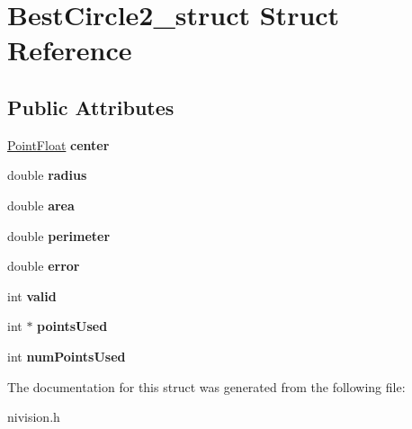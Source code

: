 \hypertarget{structBestCircle2__struct}{\section{\-Best\-Circle2\-\_\-struct \-Struct \-Reference}
\label{structBestCircle2__struct}
}
\subsection*{\-Public \-Attributes}
\begin{DoxyCompactItemize}
\item 
\hypertarget{structBestCircle2__struct_a96290746002b0162064649423d17b668}{\hyperlink{structPointFloat__struct}{\-Point\-Float} {\bfseries center}}\label{structBestCircle2__struct_a96290746002b0162064649423d17b668}

\item 
\hypertarget{structBestCircle2__struct_a0f89b21e2061967c5267b2bc56351e93}{double {\bfseries radius}}\label{structBestCircle2__struct_a0f89b21e2061967c5267b2bc56351e93}

\item 
\hypertarget{structBestCircle2__struct_a502588d492276f764b7ecae72797dc86}{double {\bfseries area}}\label{structBestCircle2__struct_a502588d492276f764b7ecae72797dc86}

\item 
\hypertarget{structBestCircle2__struct_a26ce04f3f98bec247def3981451a29ee}{double {\bfseries perimeter}}\label{structBestCircle2__struct_a26ce04f3f98bec247def3981451a29ee}

\item 
\hypertarget{structBestCircle2__struct_abbcacfd77c869ed6a63301ce5a71b797}{double {\bfseries error}}\label{structBestCircle2__struct_abbcacfd77c869ed6a63301ce5a71b797}

\item 
\hypertarget{structBestCircle2__struct_ad9be0b978c0382a74d0a3f5d69a56e4e}{int {\bfseries valid}}\label{structBestCircle2__struct_ad9be0b978c0382a74d0a3f5d69a56e4e}

\item 
\hypertarget{structBestCircle2__struct_a0057c6294478c454c2a6a485989b0d20}{int $\ast$ {\bfseries points\-Used}}\label{structBestCircle2__struct_a0057c6294478c454c2a6a485989b0d20}

\item 
\hypertarget{structBestCircle2__struct_a030d0a3cb0f6fa598f6e6deaed288b97}{int {\bfseries num\-Points\-Used}}\label{structBestCircle2__struct_a030d0a3cb0f6fa598f6e6deaed288b97}

\end{DoxyCompactItemize}


\-The documentation for this struct was generated from the following file\-:\begin{DoxyCompactItemize}
\item 
nivision.\-h\end{DoxyCompactItemize}
